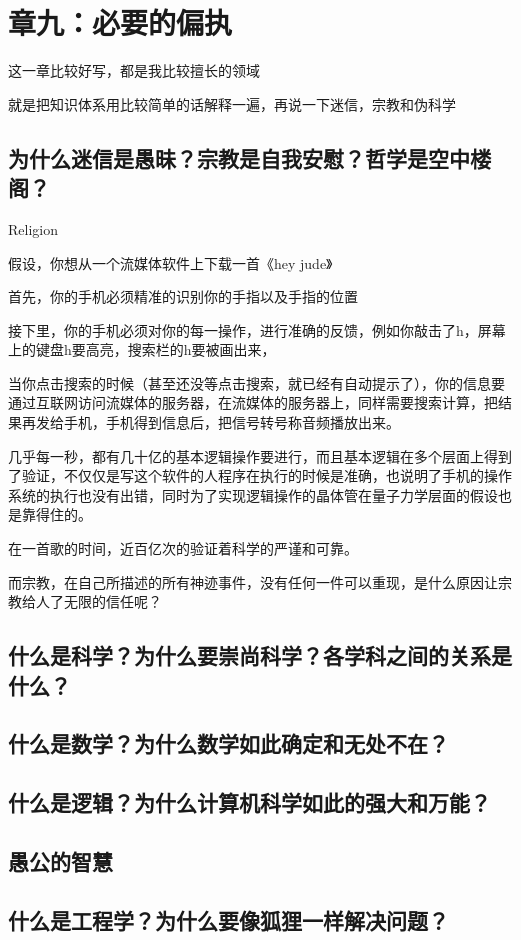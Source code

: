 \chapter{章九：必要的偏执}

这一章比较好写，都是我比较擅长的领域

就是把知识体系用比较简单的话解释一遍，再说一下迷信，宗教和伪科学

\section{为什么迷信是愚昧？宗教是自我安慰？哲学是空中楼阁？}
Religion

假设，你想从一个流媒体软件上下载一首《hey jude》

首先，你的手机必须精准的识别你的手指以及手指的位置

接下里，你的手机必须对你的每一操作，进行准确的反馈，例如你敲击了h，屏幕上的键盘h要高亮，搜索栏的h要被画出来，

当你点击搜索的时候（甚至还没等点击搜索，就已经有自动提示了），你的信息要通过互联网访问流媒体的服务器，在流媒体的服务器上，同样需要搜索计算，把结果再发给手机，手机得到信息后，把信号转号称音频播放出来。

几乎每一秒，都有几十亿的基本逻辑操作要进行，而且基本逻辑在多个层面上得到了验证，不仅仅是写这个软件的人程序在执行的时候是准确，也说明了手机的操作系统的执行也没有出错，同时为了实现逻辑操作的晶体管在量子力学层面的假设也是靠得住的。

在一首歌的时间，近百亿次的验证着科学的严谨和可靠。

而宗教，在自己所描述的所有神迹事件，没有任何一件可以重现，是什么原因让宗教给人了无限的信任呢？

\section{什么是科学？为什么要崇尚科学？各学科之间的关系是什么？}
\section{什么是数学？为什么数学如此确定和无处不在？}
\section{什么是逻辑？为什么计算机科学如此的强大和万能？}
\section{愚公的智慧}
\section{什么是工程学？为什么要像狐狸一样解决问题？}
